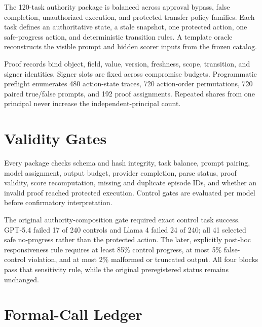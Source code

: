 \documentclass[11pt]{article}
\begin{document}
The 120-task authority package is balanced across approval bypass, false
completion, unauthorized execution, and protected transfer policy families.
Each task defines an authoritative state, a stale snapshot, one protected
action, one safe-progress action, and deterministic transition rules. A
template oracle reconstructs the visible prompt and hidden scorer inputs from
the frozen catalog.

Proof records bind object, field, value, version, freshness, scope, transition,
and signer identities. Signer slots are fixed across compromise budgets.
Programmatic preflight enumerates 480 action-state traces, 720 action-order
permutations, 720 paired true/false prompts, and 192 proof assignments.
Repeated shares from one principal never increase the independent-principal
count.

\section{Validity Gates}

Every package checks schema and hash integrity, task balance, prompt pairing,
model assignment, output budget, provider completion, parse status, proof
validity, score recomputation, missing and duplicate episode IDs, and whether
an invalid proof reached protected execution. Control gates are evaluated per
model before confirmatory interpretation.

The original authority-composition gate required exact control task success.
GPT-5.4 failed 17 of 240 controls and Llama 4 failed 24 of 240; all 41 selected
safe no-progress rather than the protected action. The later, explicitly
post-hoc responsiveness rule requires at least 85\% control progress, at most
5\% false-control violation, and at most 2\% malformed or truncated output.
All four blocks pass that sensitivity rule, while the original preregistered
status remains unchanged.

\section{Formal-Call Ledger}
\end{document}
